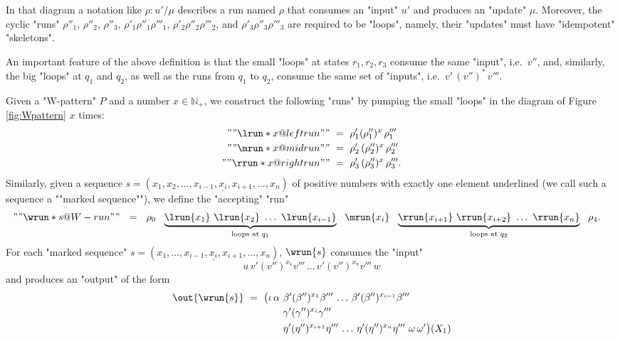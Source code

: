 \documentclass{theoretics}
\begin{document}
\begin{definition}
In that diagram a notation like $\rho: u'/\mu$ describes a run named $\rho$
that consumes an "input" $u'$ and produces an "update" $\mu$.
Moreover, the cyclic "runs" 
$\rho''_1$, 
$\rho''_2$,
$\rho''_3$,
$\rho'_1\rho''_1\rho'''_1$, 
$\rho'_2\rho''_2\rho'''_2$, and
$\rho'_3\rho''_3\rho'''_3$
are required to be "loops", namely,
their "updates" must have "idempotent" "skeletons".
\end{definition}

An important feature of the above definition is that 
the small "loops" at states $r_1,r_2,r_3$ consume the same "input", 
i.e.~$v''$, and, similarly, the big "loops" at $q_1$ and $q_2$, 
as well as the runs from $q_1$ to $q_2$, consume the same set 
of "inputs", i.e.~$v' \, (v'')^* \, v'''$. 

\AP
Given a "W-pattern" $P$ and a number $x \in \mathbb{N}_+$, 
we construct the following "runs" by pumping the small "loops" in the diagram of Figure \ref{fig:Wpattern} $x$ times:
\[
\begin{aligned}
	""\lrun*{x} @left run""  &~=~ \rho'_1 (\rho''_1)^x \, \rho'''_1 \\
    ""\mrun*{x} @mid run""   &~=~ \rho'_2 \, (\rho''_2)^x \, \rho'''_2 \\
    ""\rrun*{x} @right run"" &~=~ \rho'_3 \, (\rho''_3)^x \, \rho'''_3.
\end{aligned}
\]
\AP
Similarly, %
given a sequence 
$s=(x_1,x_2,\dots,x_{i-1},\underline{x_i},x_{i+1},\dots,x_n)$ 
of positive numbers with exactly one element underlined 
(we call such a sequence a ""marked sequence""), we define 
the "accepting" "run"  
\[
\begin{aligned}
	& ""\wrun*{s} @W-run"" ~~=~~ %
	\rho_0 ~~
    \underbrace{\lrun{x_1} ~ \lrun{x_2} ~\ldots~ \lrun{x_{i-1}}}_{\text{loops at $q_1$}} ~~
    \mrun{x_i} ~~
    \underbrace{\rrun{x_{i+1}} ~ \rrun{x_{i+2}} ~\ldots~ \rrun{x_n}}_{\text{loops at $q_2$}} 
    ~~ \rho_4.
\end{aligned}
\]
For each "marked sequence" 
$s=(x_1,\dots,x_{i-1},\underline{x_i},x_{i+1},\dots,x_n)$,
$\wrun{s}$ consumes the "input"   
\[
u \, v' (v'')^{x_1} v''' \, \dots \, 
      v' (v'')^{x_n} v''' \, 
 w
\]
and produces an "output" of the form
\[
\begin{aligned}
  \out{\wrun{s}} ~=~ 
  \big(\iota \, \alpha ~
  & \beta' (\beta'')^{x_1} \beta''' \,
  \dots \,
  \beta' (\beta'')^{x_{i-1}} \beta''' \,
  ~ \\
  & \gamma' (\gamma'')^{x_i} \gamma''' \,
  ~ \\
  & \eta' (\eta'')^{x_{i+1}} \eta''' \,
  \dots \,
  \eta' (\eta'')^{x_n} \eta'''
  ~ \omega \, \omega'\big)(X_1)
\end{aligned}
\]
\end{document}
